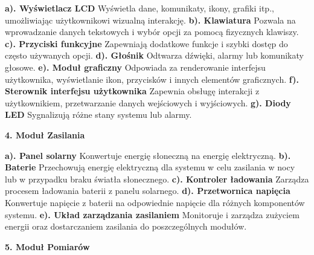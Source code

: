 \documentclass{article}
\begin{document}
\begin{flushleft}
    \textbf{a). Wyświetlacz LCD} Wyświetla dane, komunikaty, ikony, grafiki itp., umożliwiając użytkownikowi wizualną interakcję. \newline
    \textbf{b). Klawiatura} Pozwala na wprowadzanie danych tekstowych i wybór opcji za pomocą fizycznych klawiszy. \newline
    \textbf{c). Przyciski funkcyjne} Zapewniają dodatkowe funkcje i szybki dostęp do często używanych opcji. \newline
    \textbf{d). Głośnik} Odtwarza dźwięki, alarmy lub komunikaty głosowe. \newline
    \textbf{e). Moduł graficzny} Odpowiada za renderowanie interfejsu użytkownika, wyświetlanie ikon, przycisków i innych elementów graficznych. \newline
    \textbf{f). Sterownik interfejsu użytkownika} Zapewnia obsługę interakcji z użytkownikiem, przetwarzanie danych wejściowych i wyjściowych. \newline
    \textbf{g). Diody LED} Sygnalizują różne stany systemu lub alarmy. \newline
\end{flushleft}
\newpage
\large
\begin{center}
    \textbf{4. Moduł Zasilania} 
\end{center}
\begin{flushleft}
    \textbf{a). Panel solarny} Konwertuje energię słoneczną na energię elektryczną. \newline
    \textbf{b). Baterie} Przechowują energię elektryczną dla systemu w celu zasilania w nocy lub w przypadku braku światła słonecznego. \newline
    \textbf{c). Kontroler ładowania} Zarządza procesem ładowania baterii z panelu solarnego. \newline
    \textbf{d). Przetwornica napięcia} Konwertuje napięcie z baterii na odpowiednie napięcie dla różnych komponentów systemu. \newline
    \textbf{e). Układ zarządzania zasilaniem} Monitoruje i zarządza zużyciem energii oraz dostarczaniem zasilania do poszczególnych modułów. \newline
\end{flushleft}
\large
\begin{center}
    \textbf{5. Moduł Pomiarów} 
\end{center}
\end{document}
